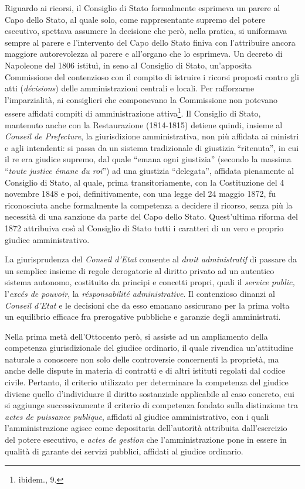\documentclass[12pt,it,a4paper,]{report}
\begin{document}
Riguardo ai ricorsi, il Consiglio di Stato formalmente esprimeva un
parere al Capo dello Stato, al quale solo, come rappresentante supremo
del potere esecutivo, spettava assumere la decisione che però, nella
pratica, si uniformava sempre al parere e l'intervento del Capo dello
Stato finiva con l'attribuire ancora maggiore autorevolezza al parere e
all'organo che lo esprimeva. Un decreto di Napoleone del 1806 istituì,
in seno al Consiglio di Stato, un'apposita Commissione del contenzioso
con il compito di istruire i ricorsi proposti contro gli atti
(\emph{décisions}) delle amministrazioni centrali e locali. Per
rafforzarne l'imparzialità, ai consiglieri che componevano la
Commissione non potevano essere affidati compiti di amministrazione
attiva\footnote{{ibidem.}, 9.}. Il Consiglio di Stato, mantenuto anche
con la Restaurazione (1814-1815) detiene quindi, insieme al
\emph{Conseil de Prefecture}, la giurisdizione amministrativa, non più
affidata ai ministri e agli intendenti: si passa da un sistema
tradizionale di giustizia ``ritenuta'', in cui il re era giudice
supremo, dal quale ``emana ogni giustizia'' (secondo la massima
``\emph{toute justice émane du roi}'') ad una giustizia ``delegata'',
affidata pienamente al Consiglio di Stato, al quale, prima
transitoriamente, con la Costituzione del 4 novembre 1848 e poi,
definitivamente, con una legge del 24 maggio 1872, fu riconosciuta anche
formalmente la competenza a decidere il ricorso, senza più la necessità
di una sanzione da parte del Capo dello Stato. Quest'ultima riforma del
1872 attribuiva così al Consiglio di Stato tutti i caratteri di un vero
e proprio giudice amministrativo.

La giurisprudenza del \emph{Conseil d'Etat} consente al \emph{droit
administratif} di passare da un semplice insieme di regole derogatorie
al diritto privato ad un autentico sistema autonomo, costituito da
principi e concetti propri, quali il \emph{service public,}
l'\emph{excés de pouvoir}, la \emph{résponsabilité administrative}. Il
contenzioso dinanzi al \emph{Conseil d'Etat} e le decisioni che da esso
emanano assicurano per la prima volta un equilibrio efficace fra
prerogative pubbliche e garanzie degli amministrati.

Nella prima metà dell'Ottocento però, si assiste ad un ampliamento della
competenza giurisdizionale del giudice ordinario, il quale rivendica
un'attitudine naturale a conoscere non solo delle controversie
concernenti la proprietà, ma anche delle dispute in materia di contratti
e di altri istituti regolati dal codice civile. Pertanto, il criterio
utilizzato per determinare la competenza del giudice diviene quello
d'individuare il diritto sostanziale applicabile al caso concreto, cui
si aggiunge successivamente il criterio di competenza fondato sulla
distinzione tra \emph{actes de puissance publique}, affidati al giudice
amministrativo, con i quali l'amministrazione agisce come depositaria
dell'autorità attribuita dall'esercizio del potere esecutivo, e
\emph{actes de gestion} che l'amministrazione pone in essere in qualità
di garante dei servizi pubblici, affidati al giudice ordinario.
\end{document}
